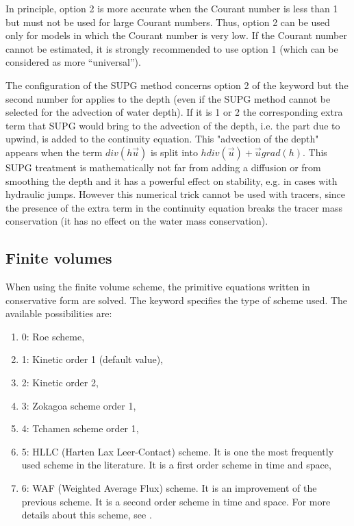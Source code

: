  In principle, option 2 is more accurate when the Courant number is less than 1 but must not be used for large Courant numbers. Thus, option 2 can be used only for models in which the Courant number is very low. If the Courant number cannot be estimated, it is strongly recommended to use option 1 (which can be considered as more ``universal'').

 The configuration of the SUPG method concerns option 2 of the keyword  but the second number for  applies to the depth (even if the SUPG method cannot be selected for the advection of water depth). If it is 1 or 2 the corresponding extra term that SUPG would bring to the advection of the depth, i.e. the part due to upwind, is added to the continuity equation. This "advection of the depth" appears when the term $div(h\vec{u})$ is split into $h div(\vec{u}) + \vec{u}grad(h)$. This SUPG treatment is mathematically not far from adding a diffusion or from smoothing the depth and it has a powerful effect on stability, e.g. in cases with hydraulic jumps. However this numerical trick cannot be used with tracers, since the presence of the extra term in the continuity equation breaks the tracer mass conservation (it has no effect on the water mass conservation).


\subsection{Finite volumes}
 When using the finite volume scheme, the primitive equations written in conservative form are solved. The keyword  specifies the type of scheme used. The available possibilities are:

\begin{enumerate}
\item [\nonumber]  0: Roe scheme,

\item [\nonumber]  1: Kinetic order 1 (default value),

\item [\nonumber]  2: Kinetic order 2,

\item [\nonumber]  3: Zokagoa scheme order 1,

\item [\nonumber]  4: Tchamen scheme order 1,

\item [\nonumber]  5: HLLC (Harten Lax Leer-Contact) scheme. It is one the most frequently used scheme in the literature. It is a first order scheme in time and space,

\item [\nonumber]  6: WAF (Weighted Average Flux) scheme. It is an improvement of the previous scheme. It is a second order scheme in time and space. For more details about this scheme, see \cite{Ata2012}.
\end{enumerate}

